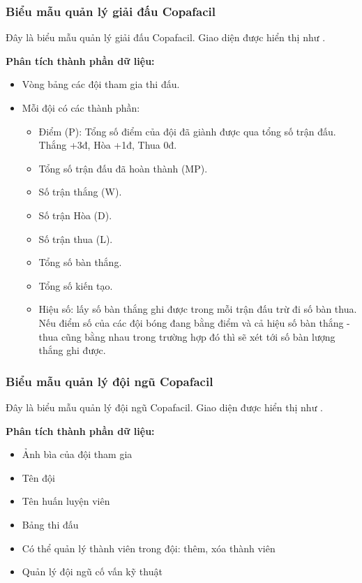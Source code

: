 
\subsubsection{Biểu mẫu quản lý giải đấu Copafacil}

Đây là biểu mẫu quản lý giải đấu Copafacil.
Giao diện được hiển thị như .

\noindent
\textbf{Phân tích thành phần dữ liệu:}
\begin{itemize}[leftmargin=1.5cm, label={--}]
  \item Vòng bảng các đội tham gia thi đấu.
  \item Mỗi đội có các thành phần:
        \begin{itemize}[label={+}]
          \item Điểm (P): Tổng số điểm của đội đã giành được qua tổng số trận đấu.
                Thắng +3đ, Hòa +1đ, Thua 0đ.
          \item Tổng số trận đấu đã hoàn thành (MP).
          \item Số trận thắng (W).
          \item Số trận Hòa (D).
          \item Số trận thua (L).
          \item Tổng số bàn thắng.
          \item Tổng số kiến tạo.
          \item Hiệu số: lấy số bàn thắng ghi được trong mỗi trận đấu trừ đi số bàn thua. Nếu điểm số của các đội bóng đang bằng điểm và cả hiệu số bàn thắng - thua cũng bằng nhau trong trường hợp đó thì sẽ xét tới số bàn lượng thắng ghi được.
        \end{itemize}
\end{itemize}

\subsubsection{Biểu mẫu quản lý đội ngũ Copafacil}

Đây là biểu mẫu quản lý đội ngũ Copafacil.
Giao diện được hiển thị như .

\noindent
\textbf{Phân tích thành phần dữ liệu:}
\begin{itemize}[leftmargin=1.5cm, label={--}]
  \item Ảnh bìa của đội tham gia
  \item Tên đội
  \item Tên huấn luyện viên
  \item Bảng thi đấu
  \item Có thể quản lý thành viên trong đội: thêm, xóa thành viên
  \item Quản lý đội ngũ cố vấn kỹ thuật
\end{itemize}


